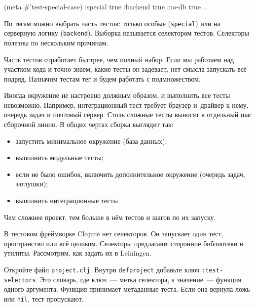 \else

\begin{english}
  \begin{clojure}
(meta #'test-special-case)
{:special true :backend true :no-db true ...}
  \end{clojure}
\end{english}

\fi

По тегам можно выбрать часть тестов: только особые (\verb|special|) или на
серверную логику (\verb|backend|). Выборка называется селектором
тестов. Селекторы полезны по нескольким причинам.

Часть тестов отработает быстрее, чем полный набор. Если мы работаем над участком
кода и точно знаем, какие тесты он задевает, нет смысла запускать всё
подряд. Назначим тестам тег и будем работать с подмножеством.

Иногда окружение не настроено должным образом, и выполнить все тесты
невозможно. Например, интеграционный тест требует браузер и~драйвер к нему,
очередь задач и почтовый сервер. Столь сложные тесты выносят в отдельный шаг
сборочной линии. В общих чертах сборка выглядит так:

\begin{itemize}

\item
  запустить минимальное окружение (база данных);

\item
  выполнить модульные тесты;

\item
  если не было ошибок, включить дополнительное окружение (очередь задач,
  заглушки);

\item
  выполнить интеграционные тесты.

\end{itemize}

\noindent
Чем сложнее проект, тем больше в нём тестов и шагов по их запуску.

В тестовом фреймворке Clojure нет селекторов. Он запускает один тест,
пространство или всё целиком. Селекторы предлагают сторонние библиотеки и
утилиты. Рассмотрим, как задать их в Leiningen.

Откройте файл \verb|project.clj|. Внутри \texttt{def\-pro\-ject} добавьте ключ
\verb|:test-selectors|. Это словарь, где ключ~--- метка селектора, а
значение~--- функция одного аргумента. Функция принимает метаданные теста. Если
она вернула ложь или \verb|nil|, тест пропускают.

